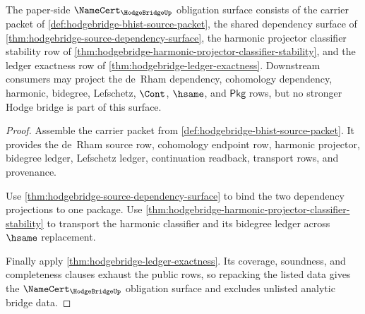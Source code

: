 \begin{theorem}
\label{thm:hodgebridge-namecert-obligation-surface}
The paper-side $\NameCert_{\HodgeBridgeUp}$ obligation surface consists of the carrier packet of \autoref{def:hodgebridge-bhist-source-packet}, the shared dependency surface of \autoref{thm:hodgebridge-source-dependency-surface}, the harmonic projector classifier stability row of \autoref{thm:hodgebridge-harmonic-projector-classifier-stability}, and the ledger exactness row of \autoref{thm:hodgebridge-ledger-exactness}. Downstream consumers may project the de~Rham dependency, cohomology dependency, harmonic, bidegree, Lefschetz, $\Cont$, $\hsame$, and $\mathsf{Pkg}$ rows, but no stronger Hodge bridge is part of this surface.
\end{theorem}
\begin{proof}
Assemble the carrier packet from \autoref{def:hodgebridge-bhist-source-packet}. It provides the de~Rham source row, cohomology endpoint row, harmonic projector, bidegree ledger, Lefschetz ledger, continuation readback, transport rows, and provenance.

Use \autoref{thm:hodgebridge-source-dependency-surface} to bind the two dependency projections to one package. Use \autoref{thm:hodgebridge-harmonic-projector-classifier-stability} to transport the harmonic classifier and its bidegree ledger across $\hsame$ replacement.

Finally apply \autoref{thm:hodgebridge-ledger-exactness}. Its coverage, soundness, and completeness clauses exhaust the public rows, so repacking the listed data gives the $\NameCert_{\HodgeBridgeUp}$ obligation surface and excludes unlisted analytic bridge data.
\end{proof}

